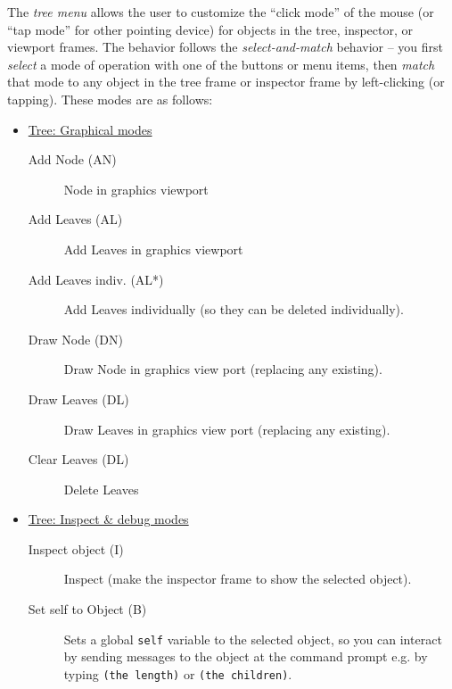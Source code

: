 \documentclass [11pt]{book}
\begin{document}
The \emph{tree menu} allows the user to customize the ``click mode'' of the
mouse (or ``tap mode'' for other pointing device) for objects in the
tree, inspector, or viewport frames. The behavior follows the \emph{select-and-match} behavior -- you first \emph{select} a mode of operation with one of the buttons or menu items, 
then \emph{match} that mode to any object in the tree frame or inspector frame by
left-clicking (or tapping). These modes are as follows:



\begin{itemize}

\item 
\underline{Tree: Graphical modes}

\begin{description}

\item [Add Node (AN)]
Node in graphics viewport

\item [Add Leaves (AL)]
Add Leaves in graphics viewport

\item [Add Leaves indiv. (AL*)]
Add Leaves individually (so they can be deleted individually).

\item [Draw Node (DN)]
Draw Node in graphics view port (replacing any existing).

\item [Draw Leaves (DL)]
Draw Leaves in graphics view port (replacing any existing).

\item [Clear Leaves (DL)]
Delete Leaves

\end{description}



\item 
\underline{Tree: Inspect \& debug modes}

\begin{description}

\item [Inspect object (I)]
Inspect (make the inspector frame to show the selected object).

\item [Set self to Object (B)]
Sets a global \texttt{self} variable to the selected object, so you can interact by sending messages to the object at the command prompt e.g. by typing \texttt{(the length)} or \texttt{(the children)}.


\end{description}
\end{itemize}
\end{document}
